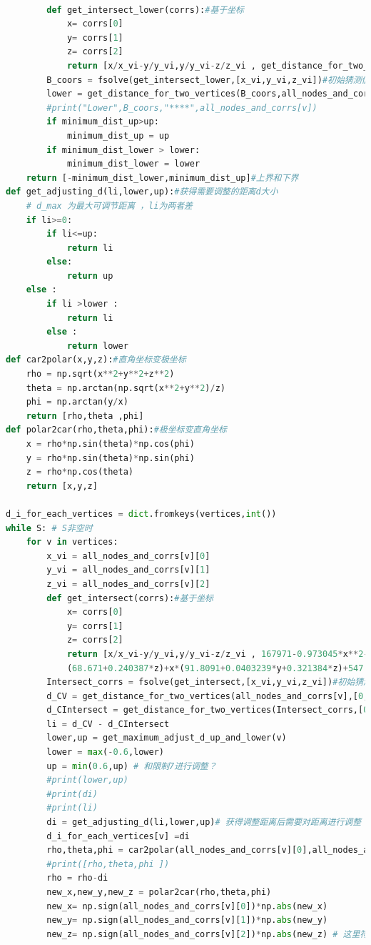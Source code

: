 \documentclass[withoutpreface,bwprint]{cumcmthesis} %
\begin{document}
\begin{appendices}
\begin{lstlisting}[language=python]
        
        def get_intersect_lower(corrs):#基于坐标
            x= corrs[0]
            y= corrs[1]
            z= corrs[2]
            return [x/x_vi-y/y_vi,y/y_vi-z/z_vi , get_distance_for_two_vertices([x,y,z],all_nodes_and_corrs[v_adjacent])-Wij*(1+0.0007)]
        B_coors = fsolve(get_intersect_lower,[x_vi,y_vi,z_vi])#初始猜测值[0,-1]
        lower = get_distance_for_two_vertices(B_coors,all_nodes_and_corrs[v])
        #print("Lower",B_coors,"****",all_nodes_and_corrs[v])
        if minimum_dist_up>up:
            minimum_dist_up = up
        if minimum_dist_lower > lower:
            minimum_dist_lower = lower 
    return [-minimum_dist_lower,minimum_dist_up]#上界和下界
def get_adjusting_d(li,lower,up):#获得需要调整的距离d大小
    # d_max 为最大可调节距离 ，li为两者差
    if li>=0:
        if li<=up:
            return li
        else:
            return up
    else :
        if li >lower :
            return li
        else :
            return lower 
def car2polar(x,y,z):#直角坐标变极坐标
    rho = np.sqrt(x**2+y**2+z**2)
    theta = np.arctan(np.sqrt(x**2+y**2)/z)
    phi = np.arctan(y/x)
    return [rho,theta ,phi]
def polar2car(rho,theta,phi):#极坐标变直角坐标
    x = rho*np.sin(theta)*np.cos(phi)
    y = rho*np.sin(theta)*np.sin(phi)
    z = rho*np.cos(theta)
    return [x,y,z]

d_i_for_each_vertices = dict.fromkeys(vertices,int())
while S: # S非空时
    for v in vertices:
        x_vi = all_nodes_and_corrs[v][0]
        y_vi = all_nodes_and_corrs[v][1]
        z_vi = all_nodes_and_corrs[v][2]
        def get_intersect(corrs):#基于坐标
            x= corrs[0]
            y= corrs[1]
            z= corrs[2]
            return [x/x_vi-y/y_vi,y/y_vi-z/z_vi , 167971-0.973045*x**2-0.984919*y**2+y*
            (68.671+0.240387*z)+x*(91.8091+0.0403239*y+0.321384*z)+547.321*z-0.0420355*z**2]
        Intersect_corrs = fsolve(get_intersect,[x_vi,y_vi,z_vi])#初始猜测值[0,-1]
        d_CV = get_distance_for_two_vertices(all_nodes_and_corrs[v],[0,0,0])
        d_CIntersect = get_distance_for_two_vertices(Intersect_corrs,[0,0,0])
        li = d_CV - d_CIntersect
        lower,up = get_maximum_adjust_d_up_and_lower(v)
        lower = max(-0.6,lower)
        up = min(0.6,up) # 和限制7进行调整？
        #print(lower,up)
        #print(di)
        #print(li)
        di = get_adjusting_d(li,lower,up)# 获得调整距离后需要对距离进行调整
        d_i_for_each_vertices[v] =di 
        rho,theta,phi = car2polar(all_nodes_and_corrs[v][0],all_nodes_and_corrs[v][1],all_nodes_and_corrs[v][2])
        #print([rho,theta,phi ])
        rho = rho-di
        new_x,new_y,new_z = polar2car(rho,theta,phi)
        new_x= np.sign(all_nodes_and_corrs[v][0])*np.abs(new_x)
        new_y= np.sign(all_nodes_and_corrs[v][1])*np.abs(new_y)
        new_z= np.sign(all_nodes_and_corrs[v][2])*np.abs(new_z) # 这里符号计算有点问题，但是小幅度的转换并不会影响到角度
        

\end{lstlisting}
\end{appendices}
\end{document}
